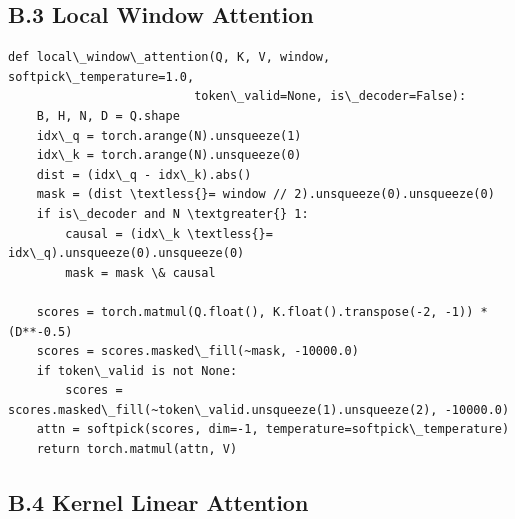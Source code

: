\subsection{B.3 Local Window Attention}

\begin{lstlisting}
def local\_window\_attention(Q, K, V, window, softpick\_temperature=1.0, 
                          token\_valid=None, is\_decoder=False):
    B, H, N, D = Q.shape
    idx\_q = torch.arange(N).unsqueeze(1)
    idx\_k = torch.arange(N).unsqueeze(0)
    dist = (idx\_q - idx\_k).abs()
    mask = (dist \textless{}= window // 2).unsqueeze(0).unsqueeze(0)
    if is\_decoder and N \textgreater{} 1:
        causal = (idx\_k \textless{}= idx\_q).unsqueeze(0).unsqueeze(0)
        mask = mask \& causal
    
    scores = torch.matmul(Q.float(), K.float().transpose(-2, -1)) * (D**-0.5)
    scores = scores.masked\_fill(~mask, -10000.0)
    if token\_valid is not None:
        scores = scores.masked\_fill(~token\_valid.unsqueeze(1).unsqueeze(2), -10000.0)
    attn = softpick(scores, dim=-1, temperature=softpick\_temperature)
    return torch.matmul(attn, V)
\end{lstlisting}

\subsection{B.4 Kernel Linear Attention}


